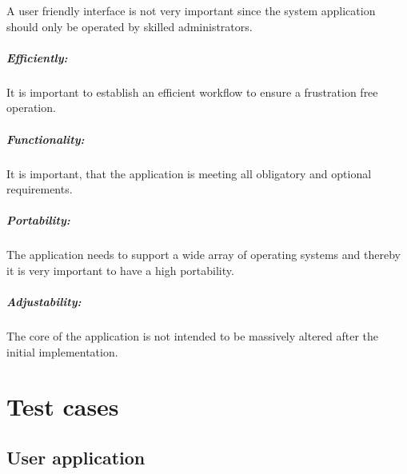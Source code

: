 A user friendly interface is not very important since the system application should only be operated by skilled administrators.

\paragraph{Efficiently:}

It is important to establish an efficient workflow to ensure a frustration free operation. 

\paragraph{Functionality:}

It is important, that the application is meeting all obligatory and optional requirements.

\paragraph{Portability:}

The application needs to support a wide array of operating systems and thereby it is very important to have a high portability.

\paragraph{Adjustability:}

The core of the application is not intended to be massively altered after the initial implementation.  

\chapter{Test cases}

\section{User application}

